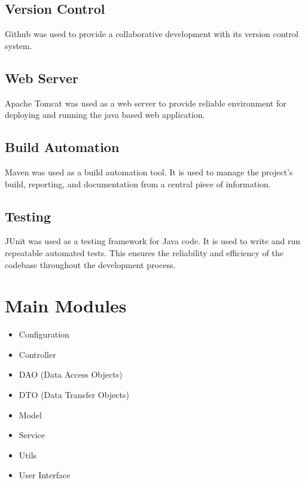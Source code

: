 \subsection*{Version Control} Github was used to provide a collaborative development with its version control system.

\subsection*{Web Server} Apache Tomcat was used as a web server to provide reliable environment for deploying and running the java based web application.

\subsection*{Build Automation} Maven was used as a build automation tool. It is used to manage the project's build, reporting, and documentation from a central piece of information.

\subsection*{Testing} JUnit was used as a testing framework for Java code. It is used to write and run repeatable automated tests. This ensures the reliability and efficiency of the codebase throughout the development process.





\section{Main Modules}
\begin{itemize}
    \item Configuration
    \item Controller
    \item DAO (Data Access Objects)
    \item DTO (Data Transfer Objects)
    \item Model 
    \item Service
    \item Utils
    \item User Interface
\end{itemize}
